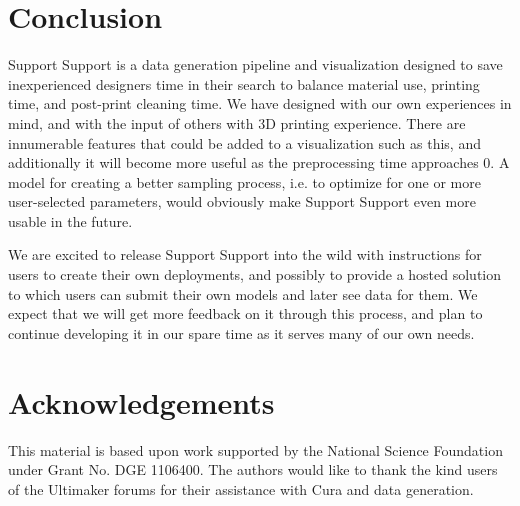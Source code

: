 \documentclass{sigchi}
\begin{document}
\section{Conclusion}
Support Support is a data generation pipeline and visualization designed to save inexperienced designers time in their search to balance material use, printing time, and post-print cleaning time.  We have designed with our own experiences in mind, and with the input of others with 3D printing experience.  There are innumerable features that could be added to a visualization such as this, and additionally it will become more useful as the preprocessing time approaches 0.  A model for creating a better sampling process, i.e. to optimize for one or more user-selected parameters, would obviously make Support Support even more usable in the future.

We are excited to release Support Support into the wild with instructions for users to create their own deployments, and possibly to provide a hosted solution to which users can submit their own models and later see data for them.  We expect that we will get more feedback on it through this process, and plan to continue developing it in our spare time as it serves many of our own needs.

\section{Acknowledgements}
This material is based upon work supported by the National Science Foundation under Grant No. DGE 1106400.  The authors would like to thank the kind users of the Ultimaker forums for their assistance with Cura and data generation.

\balance

\small

\end{document}
